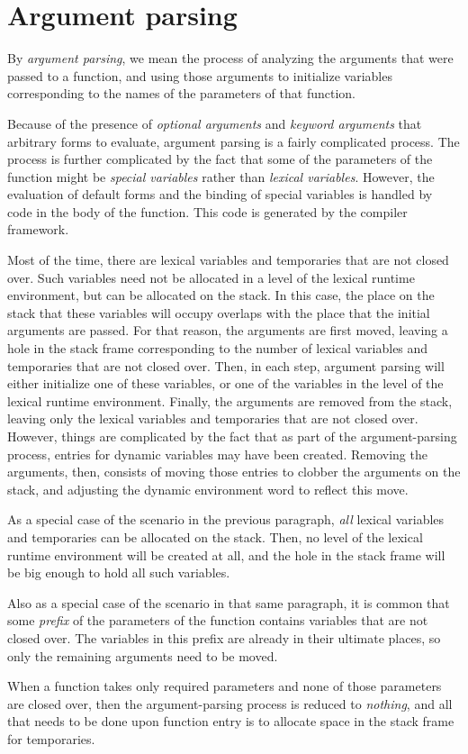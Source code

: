 \section{Argument parsing}

By \emph{argument parsing}, we mean the process of analyzing the
arguments that were passed to a function, and using those arguments to
initialize variables corresponding to the names of the parameters of
that function.

Because of the presence of \emph{optional arguments} and \emph{keyword
  arguments} that arbitrary forms to evaluate, argument parsing is a
fairly complicated process.  The process is further complicated by the
fact that some of the parameters of the function might be
\emph{special variables} rather than \emph{lexical variables}.
However, the evaluation of default forms and the binding of special
variables is handled by code in the body of the function.  This code
is generated by the \cleavir{} compiler framework.

Most of the time, there are lexical variables and temporaries that are
not closed over.  Such variables need not be allocated in a level of
the lexical runtime environment, but can be allocated on the stack.
In this case, the place on the stack that these variables will occupy
overlaps with the place that the initial arguments are passed.  For
that reason, the arguments are first moved, leaving a hole in the
stack frame corresponding to the number of lexical variables and
temporaries that are not closed over.  Then, in each step, argument
parsing will either initialize one of these variables, or one of the
variables in the level of the lexical runtime environment.  Finally,
the arguments are removed from the stack, leaving only the lexical
variables and temporaries that are not closed over.  However, things
are complicated by the fact that as part of the argument-parsing
process, entries for dynamic variables may have been created.
Removing the arguments, then, consists of moving those entries to
clobber the arguments on the stack, and adjusting the dynamic
environment word to reflect this move.

As a special case of the scenario in the previous paragraph,
\emph{all} lexical variables and temporaries can be allocated on the
stack.  Then, no level of the lexical runtime environment will be
created at all, and the hole in the stack frame will be big enough to
hold all such variables.

Also as a special case of the scenario in that same paragraph, it is
common that some \emph{prefix} of the parameters of the function
contains variables that are not closed over.  The variables in this
prefix are already in their ultimate places, so only the remaining
arguments need to be moved.

When a function takes only required parameters and none of those
parameters are closed over, then the argument-parsing process is
reduced to \emph{nothing}, and all that needs to be done upon function
entry is to allocate space in the stack frame for temporaries.

